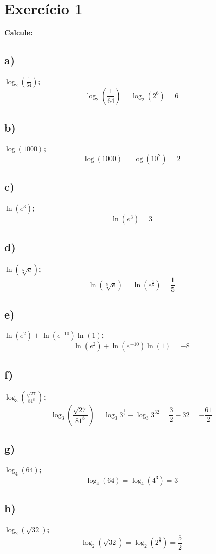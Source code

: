 \documentclass[a4paper]{article}
\begin{document}
	\section*{Exercício 1}\textbf{Calcule:}
	\subsection*{a)}\textbf{$\log_{2}\left(\frac{1}{64}\right)$;}
\[\log_{2}\left(\frac{1}{64}\right)=\log_{2}\left(2^6\right)=6\]

\subsection*{b)}\textbf{$\log\left(1000\right)$;}
\[\log\left(1000\right)=\log\left(10^2\right)=2\]

\subsection*{c)}\textbf{$\ln\left(e^3\right)$;}
\[\ln\left(e^3\right)=3\]

\subsection*{d)}\textbf{$\ln\left(\sqrt[5]{e}\right)$;}
\[\ln\left(\sqrt[5]{e} \right)=\ln\left(e^{\frac{1}{5}} \right)=\frac{1}{5}\]

\subsection*{e)}\textbf{$\ln\left(e^2\right)+\ln\left(e^{-10}\right)\ln\left(1\right)$;}
\[\ln\left(e^2\right)+\ln\left(e^{-10}\right)\ln\left(1\right)=-8\]

\subsection*{f)}\textbf{$\log_{3}\left(\frac{\sqrt{27}}{81^8}\right)$;}
\[\log_{3}\left(\frac{\sqrt{27}}{81^8}\right)=\log_{3} 3^{\frac{3}{2}}-\log_{3}3^{32}=\frac{3}{2}-32=-\frac{61}{2}\]

\subsection*{g)}\textbf{$\log_{4}\left(64\right)$;}
\[\log_{4}\left(64\right)=\log_{4}\left(4^3\right)=3\]

\subsection*{h)}\textbf{$\log_{2}\left(\sqrt{32}\right)$;}
\[\log_{2}\left(\sqrt{32}\right)=\log_{2}\left(2^{\frac{5}{2}}\right)=\frac{5}{2}\]
\end{document}
